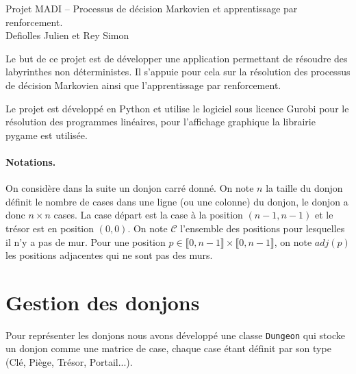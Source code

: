 \documentclass[a4paper]{article}
\theoremstyle{plain}
\begin{document}
{\centering \noindent \huge Projet MADI -- Processus de décision Markovien et apprentissage par renforcement.}
\vspace{0.5cm}\\
{\Large Defiolles Julien et Rey Simon}

\vspace{0.8cm}

Le but de ce projet est de développer une application permettant de résoudre des labyrinthes non déterministes. Il s'appuie pour cela sur la résolution des processus de décision Markovien ainsi que l'apprentissage par renforcement.

Le projet est développé en Python et utilise le logiciel sous licence Gurobi pour le résolution des programmes linéaires, pour l'affichage graphique la librairie pygame est utilisée.

\paragraph{Notations.} On considère dans la suite un donjon carré donné. On note $n$ la taille du donjon définit le nombre de cases dans une ligne (ou une colonne) du donjon, le donjon a donc $n \times n$ cases. La case départ est la case à la position $(n - 1, n - 1)$ et le trésor est en position $(0, 0)$. On note $\mathcal{C}$ l'ensemble des positions pour lesquelles il n'y a pas de mur. Pour une position $p \in \llbracket 0, n- 1\rrbracket \times \llbracket 0, n- 1\rrbracket$, on note $adj(p)$ les positions adjacentes qui ne sont pas des murs.

\section{Gestion des donjons}

Pour représenter les donjons nous avons développé une classe \texttt{Dungeon} qui stocke un donjon comme une matrice de case, chaque case étant définit par son type (Clé, Piège, Trésor, Portail...). 
\end{document}

